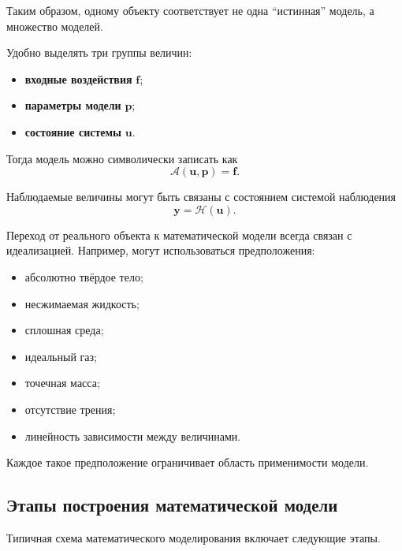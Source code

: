 Таким образом, одному объекту соответствует не одна ``истинная'' модель,
а множество моделей.

Удобно выделять три группы величин:
\begin{itemize}
	\item \textbf{входные воздействия} $\mathbf{f}$;
	\item \textbf{параметры модели} $\mathbf{p}$;
	\item \textbf{состояние системы} $\mathbf{u}$.
\end{itemize}

Тогда модель можно символически записать как
\[
\mathcal{A}(\mathbf{u},\mathbf{p}) = \mathbf{f}.
\]

Наблюдаемые величины могут быть связаны с состоянием системой наблюдения
\[
\mathbf{y} = \mathcal{H}(\mathbf{u}).
\]

Переход от реального объекта к математической модели всегда связан
с идеализацией. Например, могут использоваться предположения:
\begin{itemize}
	\item абсолютно твёрдое тело;
	\item несжимаемая жидкость;
	\item сплошная среда;
	\item идеальный газ;
	\item точечная масса;
	\item отсутствие трения;
	\item линейность зависимости между величинами.
\end{itemize}

Каждое такое предположение ограничивает область применимости модели.


\subsection{Этапы построения математической модели}

Типичная схема математического моделирования включает следующие этапы.

